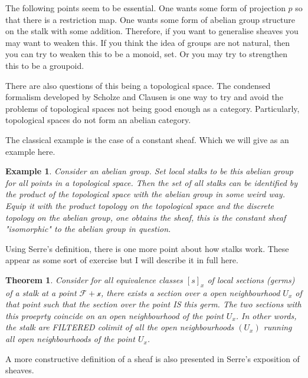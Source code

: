 \documentclass[12pt]{article}
\newtheorem{theorem}{Theorem}
\newtheorem{example}{Example}
\begin{document}
The following points seem to be essential. One wants some form of projection $p$ so that there is a restriction map. One wants some form of abelian group structure on the stalk with some addition. Therefore, if you want to generalise sheaves you may want to weaken this. If you think the idea of groups are not natural, then you can try to weaken this to be a monoid, set. Or you may try to strengthen this to be a groupoid.

There are also questions of this being a topological space. The condensed formalism developed by Scholze and Clausen is one way to try and avoid the problems of topological spaces not being good enough as a category. Particularly, topological spaces do not form an abelian category.

The classical example is the case of a constant sheaf. Which we will give as an example here.

\begin{example}
    Consider an abelian group. Set local stalks to be this abelian group for all points in a topological space. Then the set of all stalks can be identified by the product of the topological space with the abelian group in some weird way. Equip it with the product topology on the topological space and the discrete topology on the abelian group, one obtains the sheaf, this is the constant sheaf "isomorphic" to the abelian group in question.
\end{example}

Using Serre's definition, there is one more point about how stalks work. These appear as some sort of exercise but I will describe it in full here.

\begin{theorem}
    Consider for all equivalence classes $[s]_{x}$ of local sections (germs) of a stalk at a point $\mathcal{F+x}$, there exists a section over a open neighbourhood $U_x$ of that point such that the section over the point IS this germ. The two sections with this proeprty coincide on an open neighbourhood of the point $U_x$. In other words, the stalk are FILTERED colimit of all the open neighbourhoods $(U_x)$ running all open neighbourhoods of the point $U_x$.
\end{theorem}

A more constructive definition of a sheaf is also presented in Serre's exposition of sheaves.
\end{document}
